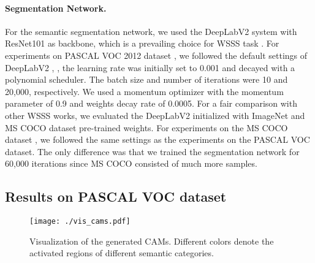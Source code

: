 \paragraph{\textbf{Segmentation Network.}}
\par For the semantic segmentation network, we used the DeepLabV2 \citep{chen2017deeplab} system with ResNet101 \citep{he2016deep} as backbone, which is a prevailing choice for WSSS task \citep{ke2021universal,lee2021anti,chang2020weakly}. For experiments on PASCAL VOC 2012 dataset \citep{everingham2010pascal}, we followed the default settings of DeepLabV2 \citep{chen2017deeplab}, \ie, the learning rate was initially set to 0.001 and decayed with a polynomial scheduler. The batch size and number of iterations were 10 and 20,000, respectively. We used a momentum optimizer with the momentum parameter of 0.9 and weights decay rate of 0.0005. For a fair comparison with other WSSS works, we evaluated the DeepLabV2 initialized with ImageNet \citep{krizhevsky2012imagenet} and MS COCO dataset \citep{lin2014microsoft} pre-trained weights. For experiments on the MS COCO dataset \citep{lin2014microsoft}, we followed the same settings as the experiments on the PASCAL VOC dataset. The only difference was that we trained the segmentation network for 60,000 iterations since MS COCO consisted of much more samples.

\subsection{Results on PASCAL VOC dataset}


\begin{figure*}[!tp]
  \centering
  \texttt{[image: ./vis\_cams.pdf]}
  \caption{Visualization of the generated CAMs. Different colors denote the activated regions of different semantic categories.}
  \label{fig_vis_cam}
\end{figure*}

